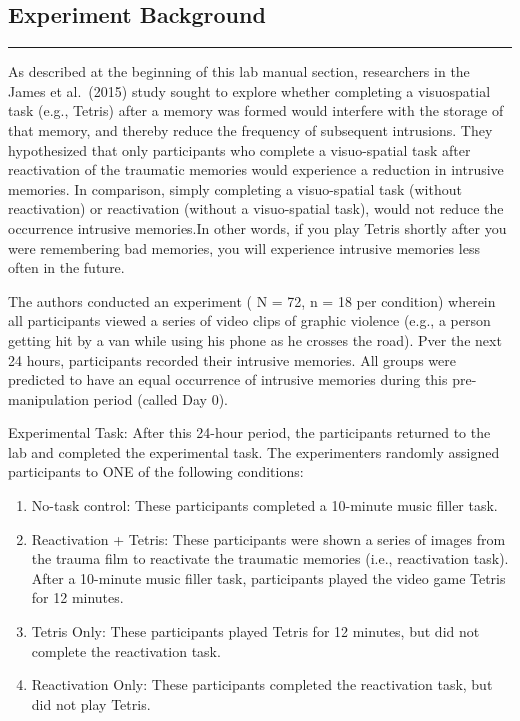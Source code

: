 \documentclass[
]{book}
\providecommand{\tightlist}{%
  \setlength{\itemsep}{0pt}\setlength{\parskip}{0pt}}
\begin{document}
\hypertarget{experiment-background-4}{%
\subsection{Experiment Background}\label{experiment-background-4}}

\begin{center}\rule{0.5\linewidth}{0.5pt}\end{center}

As described at the beginning of this lab manual section, researchers in the James et al.~(2015) study sought to explore whether completing a visuospatial task (e.g., Tetris) after a memory was formed would interfere with the storage of that memory, and thereby reduce the frequency of subsequent intrusions. They hypothesized that only participants who complete a visuo-spatial task after reactivation of the traumatic memories would experience a reduction in intrusive memories. In comparison, simply completing a visuo-spatial task (without reactivation) or reactivation (without a visuo-spatial task), would not reduce the occurrence intrusive memories.In other words, if you play Tetris shortly after you were remembering bad memories, you will experience intrusive memories less often in the future.

The authors conducted an experiment ( N = 72, n = 18 per condition) wherein all participants viewed a series of video clips of graphic violence (e.g., a person getting hit by a van while using his phone as he crosses the road). Pver the next 24 hours, participants recorded their intrusive memories. All groups were predicted to have an equal occurrence of intrusive memories during this pre-manipulation period (called Day 0).

Experimental Task: After this 24-hour period, the participants returned to the lab and completed the experimental task. The experimenters randomly assigned participants to ONE of the following conditions:

\begin{enumerate}
\def\labelenumi{\arabic{enumi}.}
\tightlist
\item
  No-task control: These participants completed a 10-minute music filler task.
\item
  Reactivation + Tetris: These participants were shown a series of images from the trauma film to reactivate the traumatic memories (i.e., reactivation task). After a 10-minute music filler task, participants played the video game Tetris for 12 minutes.
\item
  Tetris Only: These participants played Tetris for 12 minutes, but did not complete the reactivation task.
\item
  Reactivation Only: These participants completed the reactivation task, but did not play Tetris.
\end{enumerate}
\end{document}
